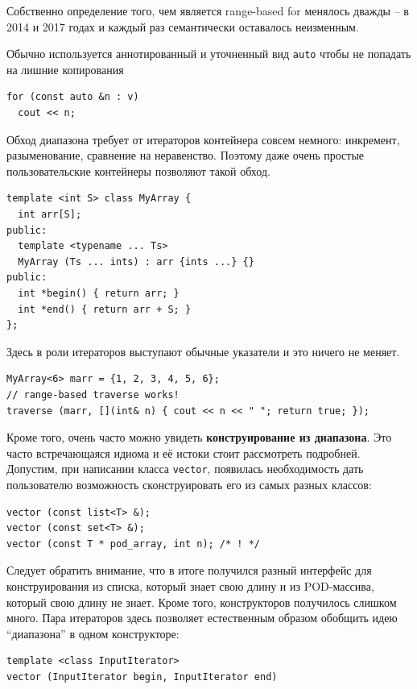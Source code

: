 \documentclass[a4paper,12pt,oneside]{book}
\begin{document}
Собственно определение того, чем является range-based for менялось дважды -- в 2014 и 2017 годах и каждый раз семантически оставалось неизменным. 

Обычно используется аннотированный и уточненный вид  \lstinline!auto! чтобы не попадать на лишние копирования

\begin{lstlisting}
for (const auto &n : v)
  cout << n;
\end{lstlisting}

Обход диапазона требует от итераторов контейнера совсем немного: инкремент, разыменование, сравнение на неравенство. Поэтому даже очень простые пользовательские контейнеры позволяют такой обход.

\begin{lstlisting}
template <int S> class MyArray {
  int arr[S];
public:
  template <typename ... Ts>
  MyArray (Ts ... ints) : arr {ints ...} {}
public:
  int *begin() { return arr; }
  int *end() { return arr + S; }
};
\end{lstlisting}

Здесь в роли итераторов выступают обычные указатели и это ничего не меняет.

\begin{lstlisting}
MyArray<6> marr = {1, 2, 3, 4, 5, 6};
// range-based traverse works!
traverse (marr, [](int& n) { cout << n << " "; return true; });
\end{lstlisting}

Кроме того, очень часто можно увидеть \textbf{конструирование из диапазона}. Это часто встречающаяся идиома и её истоки стоит рассмотреть подробней. Допустим, при написании класса \lstinline!vector!, появилась необходимость дать пользователю возможность сконструировать его из самых разных классов:

\begin{lstlisting}
vector (const list<T> &); 
vector (const set<T> &); 
vector (const T * pod_array, int n); /* ! */
\end{lstlisting}

Следует обратить внимание, что в итоге получился разный интерфейс для конструирования из списка, который знает свою длину и из POD-массива, который свою длину не знает. Кроме того, конструкторов получилось слишком много. Пара итераторов здесь позволяет естественным образом обобщить идею ``диапазона'' в одном конструкторе:

\begin{lstlisting}
template <class InputIterator>
vector (InputIterator begin, InputIterator end) 
\end{lstlisting}
\end{document}
